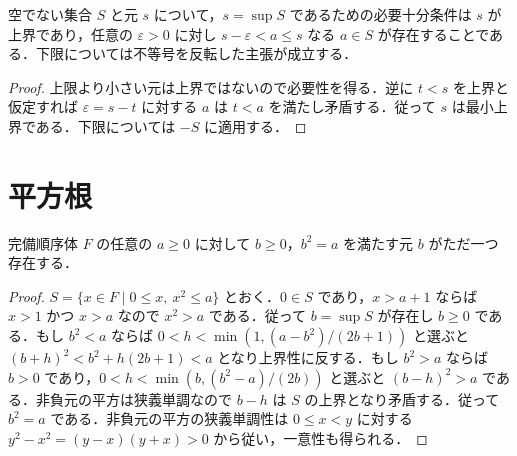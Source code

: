 \begin{prop}[上限と下限の近似]
空でない集合 $S$ と元 $s$ について，$s=\sup S$ であるための必要十分条件は $s$ が上界であり，任意の $\varepsilon>0$ に対し $s-\varepsilon<a\leq s$ なる $a\in S$ が存在することである．下限については不等号を反転した主張が成立する．
\end{prop}
\begin{proof}
上限より小さい元は上界ではないので必要性を得る．逆に $t<s$ を上界と仮定すれば $\varepsilon=s-t$ に対する $a$ は $t<a$ を満たし矛盾する．従って $s$ は最小上界である．下限については $-S$ に適用する．
\end{proof}
\section{平方根}
\begin{prop}[非負元の平方根]
完備順序体 $F$ の任意の $a\geq0$ に対して $b\geq0$，$b^2=a$ を満たす元 $b$ がただ一つ存在する．
\end{prop}
\begin{proof}
$S=\{x\in F\mid 0\leq x,\ x^2\leq a\}$ とおく．$0\in S$ であり，$x>a+1$ ならば $x>1$ かつ $x>a$ なので $x^2>a$ である．従って $b=\sup S$ が存在し $b\geq0$ である．もし $b^2<a$ ならば $0<h<\min(1,(a-b^2)/(2b+1))$ と選ぶと $(b+h)^2<b^2+h(2b+1)<a$ となり上界性に反する．もし $b^2>a$ ならば $b>0$ であり，$0<h<\min(b,(b^2-a)/(2b))$ と選ぶと $(b-h)^2>a$ である．非負元の平方は狭義単調なので $b-h$ は $S$ の上界となり矛盾する．従って $b^2=a$ である．非負元の平方の狭義単調性は $0\leq x<y$ に対する $y^2-x^2=(y-x)(y+x)>0$ から従い，一意性も得られる．
\end{proof}
